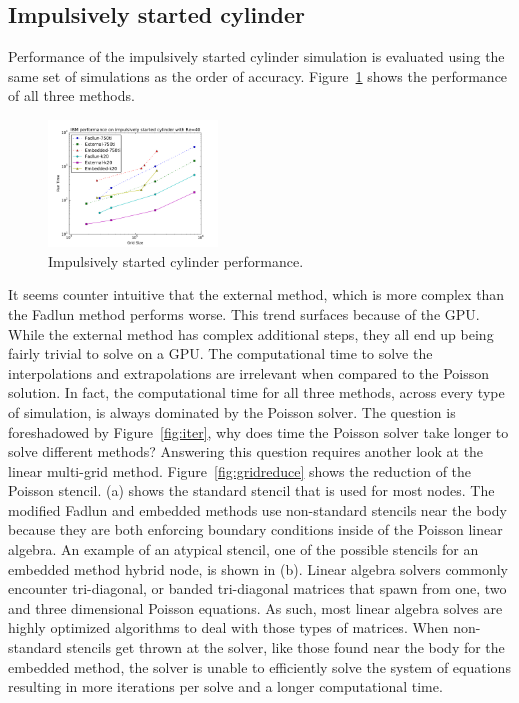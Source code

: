 \subsection{Impulsively started cylinder}

Performance of the impulsively started cylinder simulation is evaluated using the same set of simulations as the order of accuracy. 
Figure~\ref{fig:cyperf} shows the performance of all three methods.
\begin{figure}[!htb]
	\centering
	\includegraphics[width=0.4\textwidth]{cylinder_performance}
	\caption{Impulsively started cylinder performance.}
	\label{fig:cyperf}
\end{figure}
It seems counter intuitive that the external method, which is more complex than the Fadlun method performs worse. 
This trend surfaces because of the GPU.
While the external method has complex additional steps, they all end up being fairly trivial to solve on a GPU. 
The computational time to solve the interpolations and extrapolations are irrelevant when compared to the Poisson solution. 
In fact, the computational time for all three methods, across every type of simulation, is always dominated by the Poisson solver. 
The question is foreshadowed by Figure~\ref{fig:iter}, why does time the Poisson solver take longer to solve different methods?
Answering this question requires another look at the linear multi-grid method. 
Figure~\ref{fig:gridreduce} shows the reduction of the Poisson stencil. 
(a) shows the standard stencil that is used for most nodes. 
The modified Fadlun and embedded methods use non-standard stencils near the body because they are both enforcing boundary conditions inside of the Poisson linear algebra. 
An example of an atypical stencil, one of the possible stencils for an embedded method hybrid node, is shown in (b). 
Linear algebra solvers commonly encounter tri-diagonal, or banded tri-diagonal
matrices that spawn from one, two and three dimensional Poisson equations.
As such, most linear algebra solves are highly optimized algorithms to deal with those types of matrices. 
When non-standard stencils get thrown at the solver, like those found near the body for the embedded method, the solver is unable to efficiently solve the system of equations resulting in more iterations per solve and a longer computational time. 
